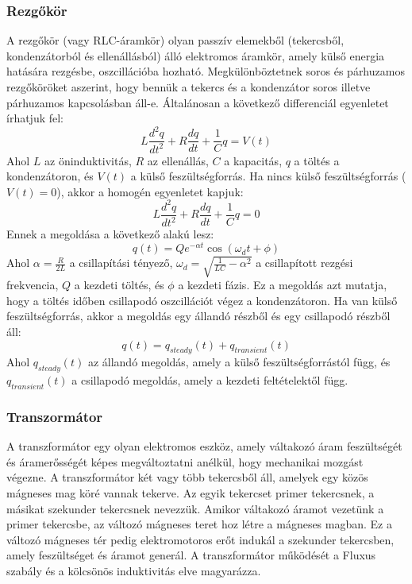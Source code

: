 \documentclass[../main.tex]{subfiles}
\begin{document}
\subsubsection{Rezgőkör}
A rezgőkör (vagy RLC-áramkör) olyan passzív elemekből (tekercsből, kondenzátorból és ellenállásból) álló elektromos áramkör, amely külső energia hatására rezgésbe, oszcillációba hozható.
Megkülönböztetnek soros és párhuzamos rezgőköröket aszerint, hogy bennük a tekercs és a kondenzátor soros illetve párhuzamos kapcsolásban áll-e. Általánosan a következő differenciál egyenletet írhatjuk fel:
\begin{equation}
    L \frac{d^2 q}{dt^2} + R \frac{dq}{dt} + \frac{1}{C} q = V(t)
\end{equation}
Ahol $L$ az öninduktivitás, $R$ az ellenállás, $C$ a kapacitás, $q$ a töltés a kondenzátoron, és $V(t)$ a külső feszültségforrás. Ha nincs külső feszültségforrás ($V(t) = 0$), akkor a homogén egyenletet kapjuk:
\begin{equation}
    L \frac{d^2 q}{dt^2} + R \frac{dq}{dt} + \frac{1}{C} q = 0
\end{equation}
Ennek a megoldása a következő alakú lesz:
\begin{equation}
    q(t) = Q e^{-\alpha t} \cos(\omega_d t + \phi)
\end{equation}
Ahol $\alpha = \frac{R}{2L}$ a csillapítási tényező, $\omega_d = \sqrt{\frac{1}{LC} - \alpha^2}$ a csillapított rezgési frekvencia, $Q$ a kezdeti töltés, és $\phi$ a kezdeti fázis. Ez a megoldás azt mutatja, hogy a töltés időben csillapodó oszcillációt végez a kondenzátoron.
Ha van külső feszültségforrás, akkor a megoldás egy állandó részből és egy csillapodó részből áll:
\begin{equation}
    q(t) = q_{steady}(t) + q_{transient}(t)
\end{equation}
Ahol $q_{steady}(t)$ az állandó megoldás, amely a külső feszültségforrástól függ, és $q_{transient}(t)$ a csillapodó megoldás, amely a kezdeti feltételektől függ.

\subsubsection{Transzormátor}
A transzformátor egy olyan elektromos eszköz, amely váltakozó áram feszültségét és áramerősségét képes megváltoztatni anélkül, hogy mechanikai mozgást végezne. A transzformátor két vagy több tekercsből áll, amelyek egy közös mágneses mag köré vannak tekerve. Az egyik tekercset primer tekercsnek, a másikat szekunder tekercsnek nevezzük.
Amikor váltakozó áramot vezetünk a primer tekercsbe, az változó mágneses teret hoz létre a mágneses magban. Ez a változó mágneses tér pedig elektromotoros erőt indukál a szekunder tekercsben, amely feszültséget és áramot generál.
A transzformátor működését a Fluxus szabály és a kölcsönös induktivitás elve magyarázza. 
\end{document}
